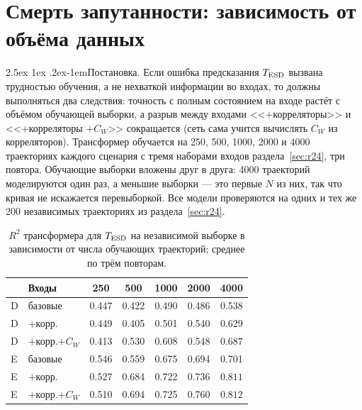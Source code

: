 \documentclass[12pt,a4paper]{report}
\makeatletter
\renewcommand\paragraph{\@startsection{paragraph}{4}{\z@}%
  {2.5ex \@plus1ex \@minus.2ex}{-1em}{\normalfont\normalsize\bfseries}}
\numberwithin{equation}{chapter}
\makeatother
\begin{document}
\section{Смерть запутанности: зависимость от объёма данных}
\label{sec:r25}

\paragraph{Постановка.} Если ошибка предсказания $T_{\rm ESD}$ вызвана
трудностью обучения, а не нехваткой информации во входах, то должны
выполняться два следствия: точность с полным состоянием на входе растёт с
объёмом обучающей выборки, а разрыв между входами <<$+$корреляторы>> и
<<$+$корреляторы $+C_W$>> сокращается (сеть сама учится вычислять $C_W$ из
корреляторов). Трансформер обучается на 250, 500, 1000, 2000 и 4000
траекториях каждого сценария с тремя наборами входов
раздела~\ref{sec:r24}, три повтора. Обучающие выборки вложены друг в друга:
4000 траекторий моделируются один раз, а меньшие выборки --- это первые $N$
из них, так что кривая не искажается перевыборкой. Все модели проверяются
на одних и тех же 200 независимых траекториях из раздела~\ref{sec:r24}.

\begin{table}[h]
\centering
\caption{$R^2$ трансформера для $T_{\rm ESD}$ на независимой выборке в
зависимости от числа обучающих траекторий; среднее по трём повторам.}
\label{tab:r25}
\small
\begin{tabular}{@{}llccccc@{}}
\toprule
 & Входы & 250 & 500 & 1000 & 2000 & 4000 \\
\midrule
D & базовые & 0.447 & 0.422 & 0.490 & 0.486 & 0.538 \\
D & $+$корр. & 0.449 & 0.405 & 0.501 & 0.540 & 0.629 \\
D & $+$корр.$+C_W$ & 0.413 & 0.530 & 0.608 & 0.548 & $\mathbf{0.687}$ \\
\midrule
E & базовые & 0.546 & 0.559 & 0.675 & 0.694 & 0.701 \\
E & $+$корр. & 0.527 & 0.684 & 0.722 & 0.736 & $\mathbf{0.811}$ \\
E & $+$корр.$+C_W$ & 0.510 & 0.694 & 0.725 & 0.760 & $\mathbf{0.812}$ \\
\bottomrule
\end{tabular}
\end{table}
\end{document}
